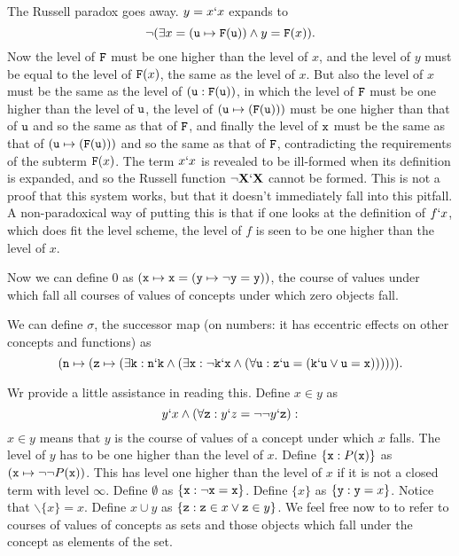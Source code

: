 \documentclass[12pt]{article}
\begin{document}
The Russell paradox goes away.  $y = x`x$ expands to $$\neg(\exists x = ({\tt u} \mapsto {\tt F}({\tt u})) \wedge y = {\tt F}(x)).$$  Now the level of ${\tt F}$ must be one higher than the level of $x$,
and the level of $y$ must be equal to the level of ${\tt F}(x)$, the same as the level of $x$.  But also the level of $x$ must be the same as the level of $({\tt u}:{\tt F}({\tt u}))$, in which the level of ${\tt F}$ must be one higher than the level of ${\tt u}$, the level of $({\tt u} \mapsto ({\tt F}({\tt u})))$ must be one higher than that of ${\tt u}$ and so the same as that of ${\tt F}$, and finally the level of ${\tt x}$ must be
the same as that of $({\tt u} \mapsto ({\tt F}({\tt u})))$ and so the same as that of ${\tt F}$, contradicting the requirements of the subterm ${\tt F}(x)$.  The term $x`x$ is revealed to be ill-formed when its definition is expanded, and so the Russell function $\neg {\bf X}`{\bf X}$ cannot be formed.  This is not a proof that this system works, but that it doesn't immediately fall into this pitfall.  A non-paradoxical way of putting this
is that if one looks at the definition of $f`x$, which does fit the level scheme, the level of $f$ is seen to be one higher than the level of $x$.

Now we can define 0 as $({\tt x} \mapsto {\tt x} = ({\tt y} \mapsto \neg {\tt y} = {\tt y}))$, the course of values under which fall all courses of values of concepts under which zero objects fall.

We can define $\sigma$, the successor map (on numbers:  it has eccentric effects on other concepts and functions) as $$({\tt n} \mapsto ({\tt z} \mapsto(\exists{\tt k }:{\tt n}`{\tt k} \wedge (\exists {\tt x}:\neg {\tt k}`{\tt x} \wedge (\forall {\tt u}: {\tt z}`{\tt u} = ({\tt  k}`{\tt u} \vee {\tt u} = {\tt x})))))).$$

Wr provide a little assistance in reading this.  Define $x \in y$ as $$y`x \wedge (\forall {\tt z}:y`z = \neg\neg y`{\tt z}):$$  $x \in y$ means that $y$ is the course of values of a concept under which $x$ falls.  The level of $y$ has to be one higher than the level of $x$.
Define $\{{\tt x}:P({\tt x})\}$ as $({\tt x} \mapsto \neg\neg P({\tt x}))$.  This has level one higher than the level of $x$ if it is not a closed term with level $\infty$.   Define $\emptyset$ as $\{{\tt x}:\neg {\tt x} = {\tt x}\}$.    Define $\{x\}$ as $\{{\tt y}:{\tt y}=x\}$. Notice that $\backslash \{x\} = x$.   Define $x \cup y$ as
$\{{\tt z}:{\tt z} \in x \vee {\tt z}\in y\}$.  We feel free now to to refer to courses of values of concepts as sets and those objects which fall under the concept as elements of the set.
\end{document}
